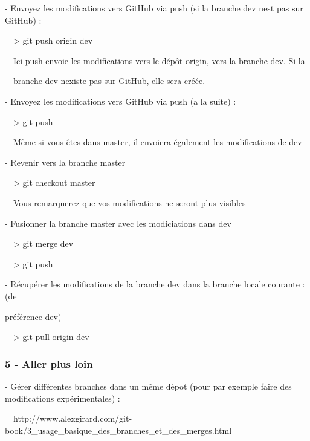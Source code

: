 \documentclass{article}
\begin{document}
\bigskip

 {}- Envoyez les modifications vers GitHub via push (si la branche
{\textquotedbl}dev{\textquotedbl} n{\textquotesingle}est pas sur
GitHub) :

\ \ {\textgreater} git push origin dev

\ \ Ici push envoie les modifications vers le dépôt origin, vers la
branche {\textquotedbl}dev{\textquotedbl}. Si la

\ \ branche dev n{\textquotesingle}existe pas sur GitHub, elle sera
créée.


\bigskip

 {}- Envoyez les modifications vers GitHub via push (a la suite) :

\ \ {\textgreater} git push

\ \ Même si vous êtes dans master, il envoiera également les
modifications de {\textquotedbl}dev{\textquotedbl}


\bigskip

 {}- Revenir vers la branche master

\ \ {\textgreater} git checkout master

\ \ Vous remarquerez que vos modifications ne seront plus visibles


\bigskip

 {}- Fusionner la branche master avec les modiciations dans
{\textquotedbl}dev{\textquotedbl}

\ \ {\textgreater} git merge dev

\ \ {\textgreater} git push


\bigskip

 {}- Récupérer les modifications de la branche
{\textquotedbl}dev{\textquotedbl} dans la branche locale courante : (de

 préférence {\textquotedbl}dev{\textquotedbl})

\ \ {\textgreater} git pull origin dev


\bigskip

\subsubsection[5 {}- Aller plus loin]{5 - Aller plus loin}

\bigskip

{}- Gérer différentes branches dans un même dépot (pour par exemple
faire des modifications expérimentales) :

\ \ http://www.alexgirard.com/git-book/3\_usage\_basique\_des\_branches\_et\_des\_merges.html
\end{document}
